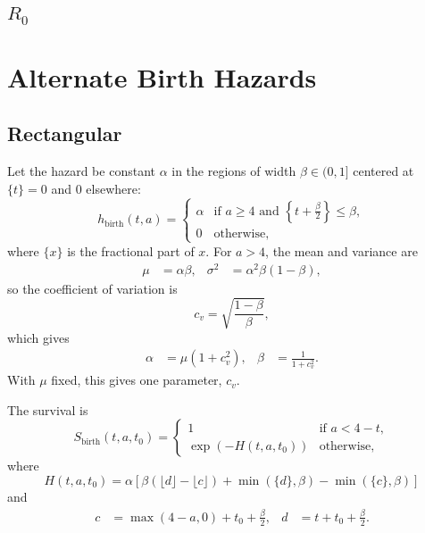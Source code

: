 \documentclass{jpmarticle}
\begin{document}
\subsection{$R_0$}


\appendix

\section{Alternate Birth Hazards}

\subsection{Rectangular}

Let the hazard be constant $\alpha$ in the regions of width
$\beta \in (0, 1]$ centered at $\{t\} = 0$ and $0$ elsewhere:
\begin{equation}
  h_{\text{birth}} (t, a) =
  \begin{cases}
    \alpha & \text{if $a \geq 4$ and $\left\{t + \frac{\beta}{2}\right\}
      \leq \beta$},
    \\
    0 & \text{otherwise},
  \end{cases}
\end{equation}
where $\{x\}$ is the fractional part of $x$.  For $a > 4$, the mean
and variance are
\begin{align}
  \mu &= \alpha \beta,
  &
  \sigma^2 &= \alpha^2 \beta (1 - \beta),
\end{align}
so the coefficient of variation is
\begin{equation}
  c_v = \sqrt{\frac{1 - \beta}{\beta}},
\end{equation}
which gives
\begin{align}
  \alpha &= \mu \left(1 + c_v^2\right),
  &
  \beta &= \frac{1}{1 + c_v^2}.
\end{align}
With $\mu$ fixed, this gives one parameter, $c_v$.

The survival is
\begin{equation}
  S_{\text{birth}}(t, a, t_0) =
  \begin{cases}
    1 & \text{if $a < 4 - t$},
    \\
    \exp\left(-H(t, a, t_0)\right)
    & \text{otherwise},
  \end{cases}
\end{equation}
where
\begin{equation}
  H(t, a, t_0) =
  \alpha \left[
    \beta (\lfloor d \rfloor - \lfloor c \rfloor)
    + \min(\{d\}, \beta)
    - \min(\{c\}, \beta)
  \right]
\end{equation}
and
\begin{align}
  c &= \max(4 - a, 0) + t_0 + \frac{\beta}{2},
  &
  d &= t + t_0 + \frac{\beta}{2}.
\end{align}
\end{document}
